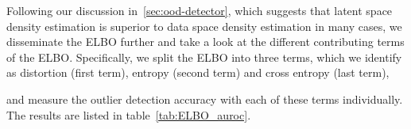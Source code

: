 \documentclass[10pt]{article} \usepackage[accepted]{tmlr}
\begin{document}
\begin{table}[h]
\begin{center}
\end{center}
\caption{\label{tab:auroc} Out of distribution detection with different models. The outlier detection accuracy is measured in terms of the AUROC. Higher values are better. Error estimates obtained through bootstrapping.}
\end{table}
Following our discussion in~\ref{sec:ood-detector}, which suggests that latent space density estimation is superior to data space density estimation in many cases, we disseminate the ELBO further and take a look at the different contributing terms of the ELBO. Specifically, we  split the ELBO into three terms, which we identify as distortion (first term), entropy (second term) and cross entropy (last term),

and  measure the outlier detection accuracy with each of these terms individually. The results are listed in table~\ref{tab:ELBO_auroc}. 
\end{document}
